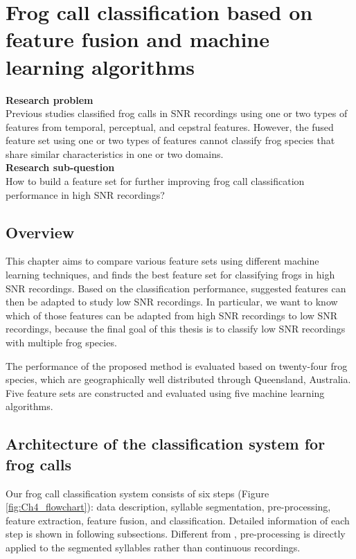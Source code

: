 
\chapter[Frog call classification based on enhanced features]{Frog call classification based on feature fusion and machine learning algorithms}
\label{cha:cha4EnhancedFeature}


\textbf{Research problem}
\\
Previous studies classified frog calls in SNR recordings using one or two types of features from temporal, perceptual, and cepstral features. However, the fused feature set using one or two types of features cannot classify frog species that share similar characteristics in one or two domains.
\\
\textbf{Research sub-question}
\\
How to build a feature set for further improving frog call classification performance in high SNR recordings?



\section{Overview}
\label{S:1}



This chapter aims to compare various feature sets using different machine learning techniques, and finds the best feature set for classifying frogs in high SNR recordings. 
Based on the classification performance, suggested features can then be adapted to study low SNR recordings. In particular, we want to know which of those features can be adapted from high SNR recordings to low SNR recordings, because the final goal of this thesis is to classify low SNR recordings with multiple frog species.

The performance of the proposed method is evaluated based on twenty-four frog species, which are geographically well distributed through Queensland, Australia. Five feature sets are constructed and evaluated using five machine learning algorithms. 



\section{Architecture of the classification system for frog calls}
Our frog call classification system consists of six steps (Figure~ \ref{fig:Ch4_flowchart}): data description, syllable segmentation, pre-processing,  feature extraction, feature fusion, and classification. Detailed information of each step is shown in following subsections. Different from \citep{huang2009frog}, pre-processing is directly applied to the segmented syllables rather than continuous recordings.

